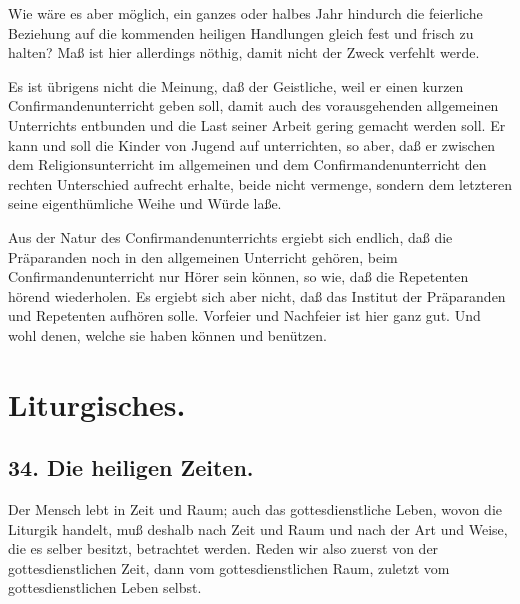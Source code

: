 Wie wäre es aber möglich, ein ganzes oder halbes Jahr hindurch die feierliche Beziehung auf die kommenden heiligen Handlungen gleich fest und frisch zu halten? Maß ist hier allerdings nöthig, damit nicht der Zweck verfehlt werde.

Es ist übrigens nicht die Meinung, daß der Geistliche, weil er einen kurzen Confirmandenunterricht geben soll, damit auch des vorausgehenden allgemeinen Unterrichts entbunden und die Last seiner Arbeit gering gemacht werden soll. Er kann und soll die Kinder von Jugend auf unterrichten, so aber, daß er zwischen dem Religionsunterricht im allgemeinen und dem Confirmandenunterricht den rechten Unterschied aufrecht erhalte, beide nicht vermenge, sondern dem letzteren seine eigenthümliche Weihe und Würde laße.

Aus der Natur des Confirmandenunterrichts ergiebt sich endlich, daß die Präparanden noch in den allgemeinen Unterricht gehören, beim Confirmandenunterricht nur Hörer sein können, so wie, daß die Repetenten hörend wiederholen. Es ergiebt sich aber nicht, daß das Institut der Präparanden und Repetenten aufhören solle. Vorfeier und Nachfeier ist hier ganz gut. Und wohl denen, welche sie haben können und benützen.

\section*{Liturgisches.}

\subsection*{34. Die heiligen Zeiten.}

Der Mensch lebt in Zeit und Raum; auch das gottesdienstliche Leben, wovon die Liturgik handelt, muß deshalb nach Zeit und Raum und nach der Art und Weise, die es selber besitzt, betrachtet werden. Reden wir also zuerst von der gottesdienstlichen Zeit, dann vom gottesdienstlichen Raum, zuletzt vom gottesdienstlichen Leben selbst.

